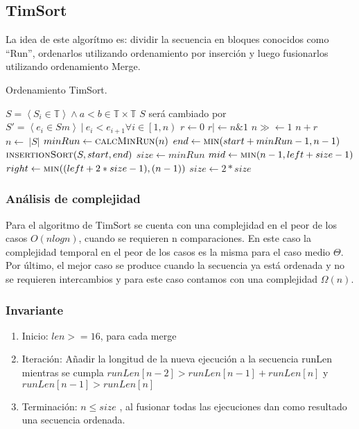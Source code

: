 \documentclass[]{article}
\begin{document}
\subsection{TimSort} \label{algoritmos:timsort}
La idea de este algorítmo es: dividir la secuencia en bloques conocidos como ``Run'', ordenarlos utilizando ordenamiento por inserción y luego fusionarlos utilizando ordenamiento Merge.
\begin{algorithm}[h]
    \caption{Ordenamiento TimSort.}
    \begin{algorithmic}[1]
        \Require $S=\left< S_i \in \mathbb{T} \right> \land a<b \in \mathbb{T} \times \mathbb{T}$
        \Ensure $S$ será cambiado por $S' = \left< e_i \in S m\right> ~ | ~ e_i < e_{i+1} \forall i \in \left[1,n\right)$
        \State $r \leftarrow 0$
        \State $r | \leftarrow n \& 1$
        \State $n \gg \leftarrow 1$
        \EndWhile
        \State \Return $n+r$
        \EndFunction
        \Statex
        \State $n  \leftarrow ~|S| $
        \State $minRun \leftarrow \Call{calcMinRun}{n}$
        \State $end \leftarrow \Call{min}{start+minRun-1,n-1}$
        \State $\Call{insertionSort}{S,start,end}$
        \EndFor
        \State $size \leftarrow minRun$
        \State $mid \leftarrow \Call{min}{n-1,left+size-1}$
        \State $right \leftarrow \Call{min}{(left+2*size-1),(n-1)}$
        \State {}
        \EndIf
        \EndFor
        \State $size \leftarrow 2*size$
        \EndWhile
        \EndProcedure
    \end{algorithmic}
\end{algorithm}
\subsubsection{Análisis de complejidad} \label{algoritmos:timsort:complejidad}
Para el algoritmo de TimSort se cuenta con una complejidad en el peor de los casos $O(nlogn)$, cuando se requieren n comparaciones. En este caso la complejidad temporal en el peor de los casos es la misma para el caso medio $\Theta$. Por último, el mejor caso se produce cuando la secuencia ya está ordenada y no se requieren intercambios y para este caso contamos con una complejidad $\Omega(n)$.
\subsubsection{Invariante} \label{algoritmos:timsort:invariante}
\begin{enumerate}
    \item Inicio: $len >= 16$, para cada merge
    \item Iteración: Añadir la longitud de la nueva ejecución a la secuencia runLen mientras se cumpla $runLen[n-2] > runLen[n-1] + runLen[n]$  y $ runLen[n-1] > runLen[n]$
    \item Terminación: $n \leqslant size$ , al fusionar todas las ejecuciones dan como resultado una secuencia ordenada.
\end{enumerate}
\end{document}
